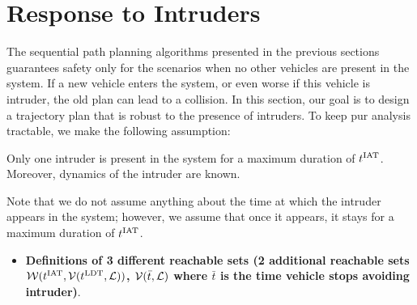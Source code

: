 \section{Response to Intruders \label{sec:HJIVI}}
The sequential path planning algorithms presented in the previous sections guarantees safety only for the scenarios when no other vehicles are present in the system. If a new vehicle enters the system, or even worse if this vehicle is intruder, the old plan can lead to a collision. In this section, our goal is to design a trajectory plan that is robust to the presence of intruders. To keep pur analysis tractable, we make the following assumption:  

\begin{assumption} \label{as:avoidOnce}
Only one intruder is present in the system for a maximum duration of $t^\text{IAT}$. Moreover, dynamics of the intruder are known. 
\end{assumption}

Note that we do not assume anything about the time at which the intruder appears in the system; however, we assume that once it appears, it stays for a maximum duration of $t^\text{IAT}$. 

\begin{itemize}
\item \textbf{Definitions of 3 different reachable sets (2 additional reachable sets $\mathcal{W}(t^\text{IAT}, \mathcal{V}(t^\text{LDT}, \mathcal{L}))$, $\mathcal{V}(\bar t, \mathcal{L})$ where $\bar t$ is the time vehicle stops avoiding intruder)}.
\end{itemize}

